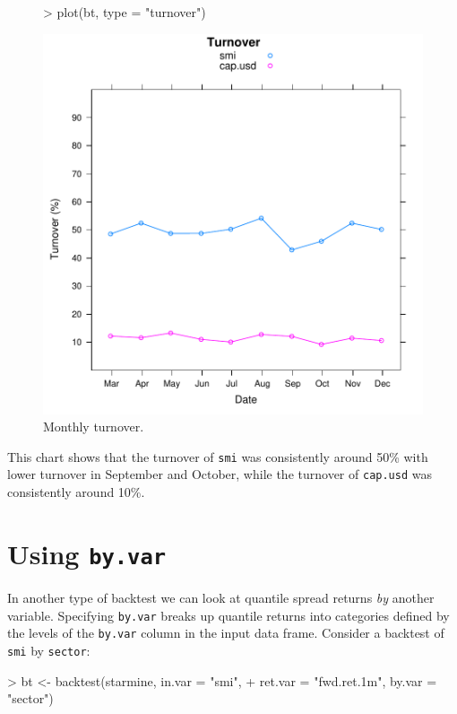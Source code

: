 \documentclass[a4paper]{report}
\begin{document}
\begin{article}
\begin{figure}
\centering
\vspace*{.1in}
\begin{Schunk}
\begin{Sinput}
> plot(bt, type = "turnover")
\end{Sinput}
\end{Schunk}
\includegraphics{backtest-022}
\caption{\label{figure:turnover}
Monthly turnover.}
\end{figure}

This chart shows that the turnover of \texttt{smi} was consistently
around 50\% with lower turnover in September and October, while the
turnover of \texttt{cap.usd} was consistently around 10\%.

\section*{Using \texttt{by.var}}

In another type of backtest we can look at quantile spread returns
\emph{by} another variable.  Specifying \texttt{by.var} breaks up
quantile returns into categories defined by the levels of the
\texttt{by.var} column in the input data frame.  Consider a backtest
of \texttt{smi} by \texttt{sector}:


\begin{Schunk}
\begin{Sinput}
> bt <- backtest(starmine, in.var = "smi", 
+     ret.var = "fwd.ret.1m", by.var = "sector")
\end{Sinput}
\end{Schunk}



\end{article}
\end{document}
